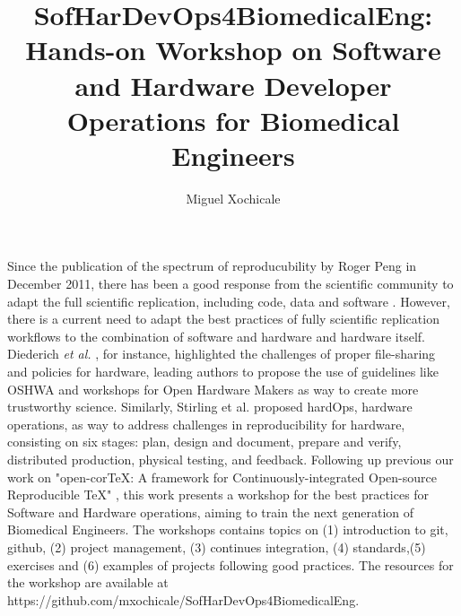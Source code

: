 \documentclass{article}
\title{
SofHarDevOps4BiomedicalEng: Hands-on Workshop on Software and Hardware Developer Operations for Biomedical Engineers %
}
\author{Miguel Xochicale}
\date{\DTMNow}
\begin{document}
\maketitle

Since the publication of the spectrum of reproducubility by Roger Peng in December 2011, there has been a good response from the scientific community to adapt the full scientific replication, including code, data and software \cite{peng2011}. 
However, there is a current need to adapt the best practices of fully scientific replication workflows to the combination of software and hardware and hardware itself.
Diederich \textit{et al.} \cite{Diederich2022}, for instance, highlighted the challenges of proper file-sharing and policies for hardware, leading authors to propose the use of guidelines like OSHWA and workshops for Open Hardware Makers as way to create more trustworthy science. 
Similarly, Stirling et al. \cite{stirling2022} proposed hardOps, hardware operations, as way to address challenges in reproducibility for hardware, consisting on six stages: plan, design and document, prepare and verify, distributed production, physical testing, and feedback. 
Following up previous our work on "open-corTeX: A framework for Continuously-integrated Open-source Reproducible TeX"
\cite{xochicale2020}, this work presents a workshop for the best practices for Software and Hardware operations, aiming to train the next generation of Biomedical Engineers.
The workshops contains topics on (1) introduction to git, github, (2) project management, (3) continues integration, (4) standards,(5) exercises and (6) examples of projects following good practices.
The resources for the workshop are available at https://github.com/mxochicale/SofHarDevOps4BiomedicalEng.

\newpage
%

\end{document}
